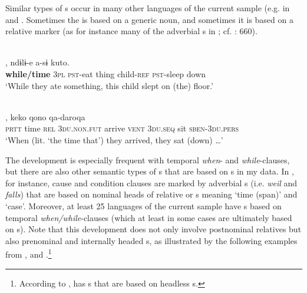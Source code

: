 \documentclass[output=paper]{langsci/langscibook}
\begin{document}
Similar types of s occur in many other languages of the current sample (e.g. in   and  . Sometimes the  is based on a generic noun, and sometimes it is based on a relative marker (as for instance many of the adverbial s in ; cf. \citealt{Heath2005}: 660). 

\ea\label{ex:diessel:10}
\\
,   ndɨlɨ-e   a-sɨ   kuto.\\
        \textbf{while/time} \textsc{3pl}   \textsc{pst-}eat   thing   child-\textsc{ref}   \textsc{pst-}sleep   down\\
\glt   `While they ate something, this child slept on (the) floor.'
\z

\ea\label{ex:diessel:11}
\\
,  keko  qono  qa-daroqa\\
        \textsc{prtt}   time  \textsc{rel}   3\textsc{du.non.fut}  arrive  \textsc{vent}  \textsc{3du.seq}  sit  \textsc{sben-3du.pers}\\
\glt   `When (lit. `the time that’) they arrived, they sat (down) …'
\z

The development is especially frequent with temporal \textit{when}- and \textit{while}-clauses, but there are also other semantic types of s that are based on s in my data. In , for instance, cause and condition clauses are marked by adverbial s (i.e. \textit{weil} and \textit{falls}) that are based on nominal heads of relative or s meaning ‘time (span)’ and ‘case’. Moreover, at least 25 languages of the current sample have s based on temporal \textit{when/while}-clauses (which at least in some cases are ultimately based on s). Note that this development does not only involve postnominal relatives but also prenominal and internally headed s, as illustrated by the following examples from  ,   and  .\footnote{According to \citet{Epps2009_RC},  has s that are based on headless s.} 
\end{document}
